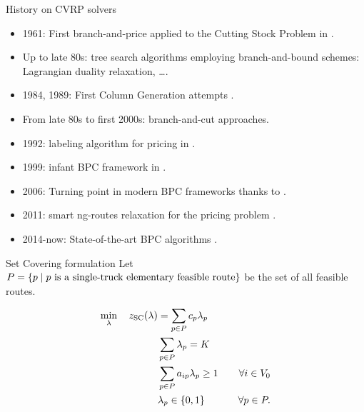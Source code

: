 \begin{frame}{History on CVRP solvers}
	\begin{itemize}
		\item 1961: First branch-and-price applied to the Cutting Stock Problem in \cite{gilmore1961}.
		\item Up to late 80s: tree search algorithms employing branch-and-bound schemes: Lagrangian duality relaxation, \dots.
		\item 1984, 1989: First Column Generation attempts \parencite{desrosiers1984, agarwal1989setpartitioningbased}.
		\item From late 80s to first 2000s: branch-and-cut approaches.
		\item 1992: labeling algorithm for pricing in \cite{desrochers1992}.
		\item 1999: infant BPC framework in \cite{kohl1999}.
		\item 2006: Turning point in modern BPC frameworks thanks to \parencite{fukasawa2006}.
		\item 2011: smart ng-routes relaxation for the pricing problem \parencite{baldacci2011}.
		\item 2014-now: State-of-the-art BPC algorithms \parencite{contardo2014,pecin2017improved,pecin2017new,pessoa2020,sadykov2021,pessoa2020generic}.
	\end{itemize}
\end{frame}

\begin{frame}{Set Covering formulation}
	Let $P = \Set*{p \mid p\ \text{is a single-truck elementary feasible route}}$ be the set of all feasible routes.

	\begin{align}
		\min_{\lambda} \quad z_\mt{SC}(\lambda) & = \sum_{p \in P}  c_p \lambda_p              & \label{eq:set-covering-obj-func}                                                       \\
		                                        & \sum_{p \in P} \lambda_{p} = K               & \label{eq:set-covering-K-routes}                                                       \\
		                                        & \sum_{p \in P}  a_{ip} \lambda_p \ge 1       & \quad \forall i \in V_0 \label{eq:set-covering-customers-visited-by-exactly-one-route} \\
		                                        & \lambda_p                    \in \Set*{0, 1} & \quad \forall p \in P \label{eq:set-covering-lambda-mip-var-bounds}.
	\end{align}
\end{frame}

